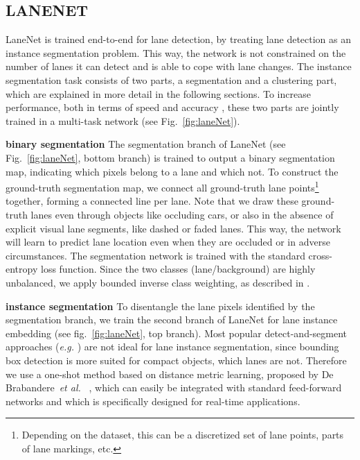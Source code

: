 \documentclass[letterpaper, 10 pt, conference]{ieeeconf}
\newcommand{\eg}{\textit{e.g. }}
\newcommand{\etal}{\textit{et al. }}
\begin{document}
\subsection{LANENET}
\label{subsec:lanenet}

LaneNet is trained end-to-end for lane detection, by treating lane detection as an instance segmentation problem. This way, the network is not constrained on the number of lanes it can detect and is able to cope with lane changes. The instance segmentation task consists of two parts, a segmentation and a clustering part, which are explained in more detail in the following sections. To increase performance, both in terms of speed and accuracy \cite{Neven17}, these two parts are jointly trained in a multi-task network (see Fig.~\ref{fig:laneNet}).

\textbf{binary segmentation}
The segmentation branch of LaneNet (see Fig.~\ref{fig:laneNet}, bottom branch) is trained to output a binary segmentation map, indicating which pixels belong to a lane and which not. To construct the ground-truth segmentation map, we connect all ground-truth lane points\footnote{Depending on the dataset, this can be a discretized set of lane points, parts of lane markings, etc.} together, forming a connected line per lane. Note that we draw these ground-truth lanes even through objects like occluding cars, or also in the absence of explicit visual lane segments, like dashed or faded lanes. This way, the network will learn to predict lane location even when they are occluded or in adverse circumstances. The segmentation network is trained with the standard cross-entropy loss function. Since the two classes (lane/background) are highly unbalanced, we apply bounded inverse class weighting, as described in \cite{Paszke16}.

\textbf{instance segmentation}
To disentangle the lane pixels identified by the segmentation branch, we train the second branch of LaneNet for lane instance embedding (see fig.~\ref{fig:laneNet}, top branch). Most popular detect-and-segment approaches (\eg \cite{He17,Dai16}) are not ideal for lane instance segmentation, since bounding box detection is more suited for compact objects, which lanes are not. Therefore we use a one-shot method based on distance metric learning, proposed by De Brabandere~\etal~\cite{Brabandere17}, which can easily be integrated with standard feed-forward networks and which is specifically designed for real-time applications. 
\end{document}
